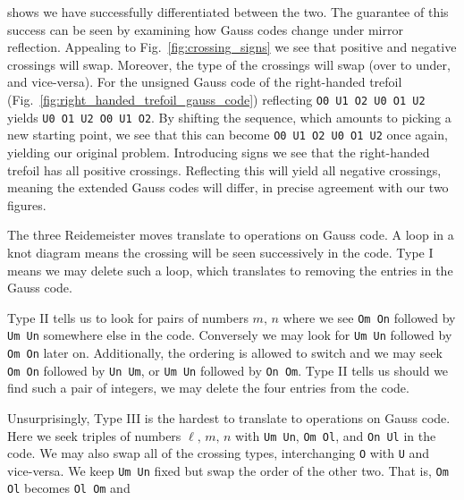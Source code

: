         shows we have successfully differentiated between the two. The
        guarantee of this success can be seen by examining how Gauss codes
        change under mirror reflection. Appealing to
        Fig.~\ref{fig:crossing_signs} we see that positive and negative
        crossings will swap. Moreover, the type of the crossings will swap
        (over to under, and vice-versa). For the unsigned Gauss code of the
        right-handed trefoil (Fig.~\ref{fig:right_handed_trefoil_gauss_code})
        reflecting \texttt{O0 U1 O2 U0 O1 U2} yields
        \texttt{U0 O1 U2 O0 U1 O2}. By shifting the sequence, which amounts
        to picking a new starting point, we see that this can become
        \texttt{O0 U1 O2 U0 O1 U2} once again, yielding our original problem.
        Introducing signs we see that the right-handed trefoil has all
        positive crossings. Reflecting this will yield all negative crossings,
        meaning the extended Gauss codes will differ, in precise agreement
        with our two figures.
        \par\hfill\par
        The three Reidemeister moves translate to operations on Gauss code.
        A loop in a knot diagram means the crossing will be seen successively
        in the code. Type I means we may delete such a loop, which translates
        to removing the entries in the Gauss code.
        \par\hfill\par
        Type II tells us to look for pairs of numbers $m,\,n$ where we see
        \texttt{Om On} followed by \texttt{Um Un} somewhere else in the code.
        Conversely we may look for \texttt{Um Un} followed by \texttt{Om On}
        later on. Additionally, the ordering is allowed to switch and we may
        seek \texttt{Om On} followed by \texttt{Un Um}, or
        \texttt{Um Un} followed by \texttt{On Om}. Type II tells us should we
        find such a pair of integers, we may delete the four entries from the
        code.
        \par\hfill\par
        Unsurprisingly, Type III is the hardest to translate to operations on
        Gauss code. Here we seek triples of numbers
        $\ell,\,m,\,n$ with \texttt{Um Un}, \texttt{Om Ol},
        and \texttt{On Ul} in the code. We may also swap all of the crossing
        types, interchanging \texttt{O} with \texttt{U} and vice-versa.
        We keep \texttt{Um Un} fixed but swap the order of the other two.
        That is, \texttt{Om Ol} becomes \texttt{Ol Om} and
